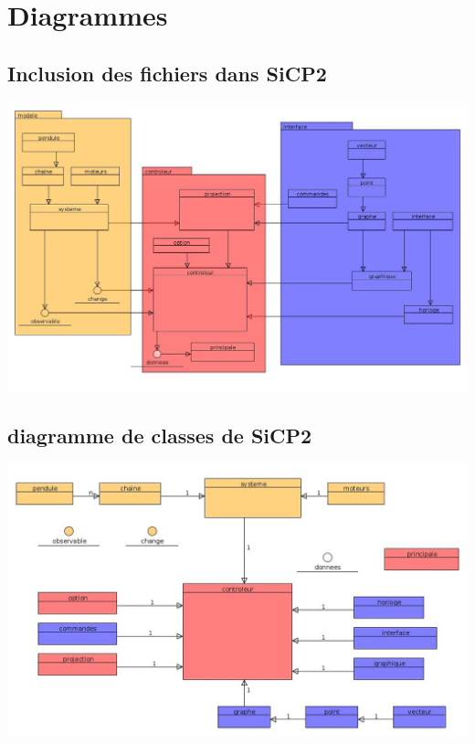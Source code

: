 %
\section{Diagrammes}
%
%
\subsection{Inclusion des fichiers dans SiCP2}
%
\begin{center}
\includegraphics[scale=0.361]{./illustration/diagramme/inclusionsSiCP2}
\end{center}
%
\subsection{diagramme de classes de SiCP2}
\begin{center}
\includegraphics[scale=0.461]{./illustration/diagramme/classesSiCP2}
\end{center}
%



